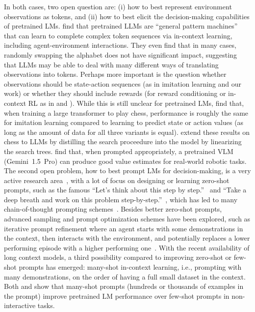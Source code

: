 \documentclass{article}
\newcommand{\ie}{i.e., }
\newcommand{\pro}{Gemini~1.5~Pro}
\begin{document}
In both cases, two open question are: (i) how to best represent environment observations as tokens, and (ii) how to best elicit the decision-making capabilities of pretrained LMs.
\citet{mirchandani2023large} find that pretrained LLMs are ``general pattern machines'' that can learn to complete complex token sequences via in-context learning, including agent-environment interactions.
They even find that in many cases, randomly swapping the alphabet does not have significant impact, suggesting that LLMs may be able to deal with many different ways of translating observations into tokens.
Perhaps more important is the question whether observations should be state-action sequences (as in imitation learning and our work) or whether they should include rewards (for reward conditioning or in-context RL as in \citet{mirchandani2023large} and \citet{raparthy2024generalization}).
While this is still unclear for pretrained LMs, \citet{ruoss2024amortized} find that, when training a large transformer to play chess, performance is roughly the same for imitation learning compared to learning to predict state or action values (as long as the amount of data for all three variants is equal).
\citet{schultz2025mastering} extend these results on chess to LLMs by distilling the search proceedure into the model by linearizing the search trees.
\citet{ma2025vision} find that, when prompted appropriately, a pretrained VLM (\pro{}) can produce good value estimates for real-world robotic tasks.
The second open problem, how to best prompt LMs for decision-making, is a very active research area~\citep{li2025why,genewein2025understanding}, with a lot of focus on designing or learning zero-shot prompts, such as the famous ``Let's think about this step by step.''~\citep{kojima2022large} and ``Take a deep breath and work on this problem step-by-step.''~\citep{yang2024large}, which has led to many chain-of-thought prompting schemes~\citep{wei2022chain}.
Besides better zero-shot prompts, advanced sampling and prompt optimization schemes have been explored,
such as iterative prompt refinement where an agent starts with some demonstrations in the context, then interacts with the environment, and potentially replaces a lower performing episode with a higher performing one~\citep{mirchandani2023large, brooks2023large}.
With the recent availability of long context models, a third possibility compared to improving zero-shot or few-shot prompts has emerged: many-shot in-context learning, \ie prompting with many demonstrations, on the order of having a full small dataset in the context.
Both \citet{agarwal2024many} and \citet{jiang2024many} show that many-shot prompts (hundreds or thousands of examples in the prompt) improve pretrained LM performance over few-shot prompts in non-interactive tasks.
\end{document}
